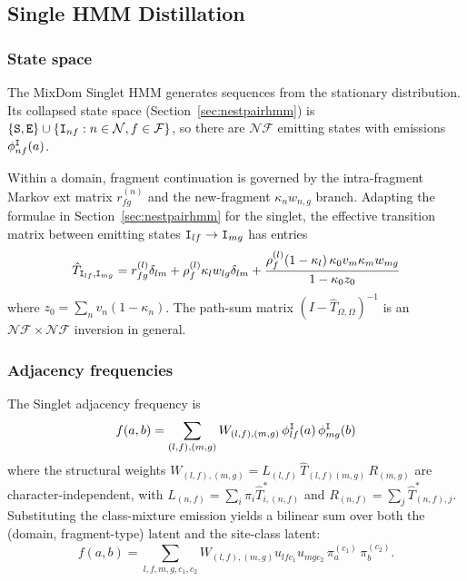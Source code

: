 \documentclass{article}
\newcommand\ext{r}
\newcommand\notext{\rho}
\newcommand\main{0}
\newcommand\dom{n}
\newcommand\ndom{\mathcal{N}}
\newcommand\nfrag{\mathcal{F}}
\newcommand\domdist{v}
\newcommand\fragdist{w}
\newcommand\classdist{u}
\newcommand\anctok{a}
\newcommand\destok{b}
\newcommand\eqm{\pi}
\newcommand\emptyseg{z}
\newcommand\sta{{\tt S}}
\newcommand\ins{{\tt I}}
\newcommand\fin{{\tt E}}
\newcommand\emit{\Omega}
\newcommand\effT{\hat{T}}
\newcommand\srcdom{l}
\newcommand\destdom{m}
\newcommand\frag{f}
\newcommand\srcfrag{f}
\newcommand\destfrag{g}
\newcommand\class{c}
\begin{document}
\subsection{Single HMM Distillation}

\subsubsection{State space}

The MixDom Singlet HMM generates sequences from the stationary
distribution. Its collapsed state space (Section~\ref{sec:nestpairhmm})
is $\{ \sta, \fin \} \cup \{ \ins_{\dom\frag} : \dom \in \ndom,
\frag \in \nfrag \}$, so there are $\ndom\nfrag$ emitting states with
emissions $\phi^\ins_{\dom\frag}(\anctok)$.

Within a domain, fragment continuation is governed by the intra-fragment
Markov ext matrix $\ext^{(\dom)}_{\srcfrag\destfrag}$ and the
new-fragment $\kappa_\dom \fragdist_{\dom,\destfrag}$ branch.
Adapting the formulae in Section~\ref{sec:nestpairhmm} for the singlet,
the effective transition matrix between emitting states
$\ins_{\srcdom\srcfrag} \to \ins_{\destdom\destfrag}$ has entries
\[
\effT_{\ins_{\srcdom\srcfrag},\ins_{\destdom\destfrag}}
= \ext^{(\srcdom)}_{\srcfrag\destfrag}\delta_{\srcdom\destdom}
+ \notext^{(\srcdom)}_\srcfrag \kappa_\srcdom \fragdist_{\srcdom\destfrag}\delta_{\srcdom\destdom}
+ \frac{\notext^{(\srcdom)}_\srcfrag (1-\kappa_\srcdom)\,
       \kappa_\main \domdist_\destdom \kappa_\destdom \fragdist_{\destdom\destfrag}}
       {1 - \kappa_\main \emptyseg_0}
\]
where $\emptyseg_0 = \sum_\dom \domdist_\dom (1-\kappa_\dom)$.
The path-sum matrix $(I - \effT_{\emit,\emit})^{-1}$ is an
$\ndom\nfrag \times \ndom\nfrag$ inversion in general.

\subsubsection{Adjacency frequencies}

The Singlet adjacency frequency is
\begin{equation}\label{eq:single-adj}
f(\anctok, \destok)
= \sum_{(\srcdom,\srcfrag),(\destdom,\destfrag)}
  W_{(\srcdom,\srcfrag),(\destdom,\destfrag)}\,
  \phi^\ins_{\srcdom\srcfrag}(\anctok)\,
  \phi^\ins_{\destdom\destfrag}(\destok)
\end{equation}
where the structural weights
$W_{(\srcdom,\srcfrag),(\destdom,\destfrag)}
= L_{(\srcdom,\srcfrag)}\, \effT_{(\srcdom,\srcfrag)(\destdom,\destfrag)}\,
R_{(\destdom,\destfrag)}$ are character-independent, with
$L_{(\dom,\frag)} = \sum_i \pi_i \effT^\ast_{i,(\dom,\frag)}$ and
$R_{(\dom,\frag)} = \sum_j \effT^\ast_{(\dom,\frag),j}$.
Substituting the class-mixture emission yields a bilinear sum over
both the (domain, fragment-type) latent and the site-class latent:
\[
f(\anctok, \destok)
= \sum_{\srcdom,\srcfrag,\destdom,\destfrag,\class_1,\class_2}
  W_{(\srcdom,\srcfrag),(\destdom,\destfrag)}
  \classdist_{\srcdom\srcfrag\class_1}
  \classdist_{\destdom\destfrag\class_2}\,
  \eqm^{(\class_1)}_\anctok\, \eqm^{(\class_2)}_\destok.
\]
\end{document}
